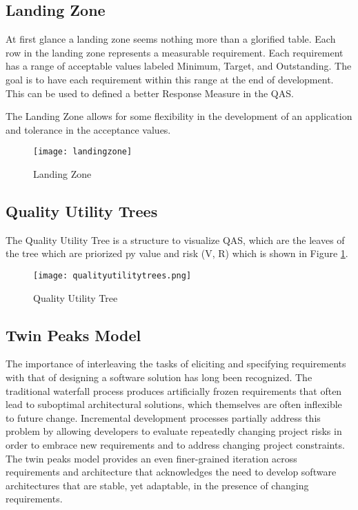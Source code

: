 \subsection{Landing Zone}
At first glance a landing zone seems nothing more than a glorified table. Each row in the landing zone represents a measurable requirement. Each requirement has a range of acceptable values labeled Minimum, Target, and Outstanding. The goal is to have each requirement within this range at the end of development. This can be used to defined a better Response Measure in the QAS.

The Landing Zone allows for some flexibility in the development of an application and tolerance in the acceptance values.

\begin{figure}[H]	
	\center
	\texttt{[image: landingzone]}
 	\caption{Landing Zone}
\end{figure}

\subsection{Quality Utility Trees}
The Quality Utility Tree is a structure to visualize QAS, which are the leaves of the tree which are priorized py value and risk (V, R) which is shown in Figure \ref{fig:qualityutilitytree}.

\begin{figure}[H]
	\center
	\texttt{[image: qualityutilitytrees.png]}
	\caption{Quality Utility Tree}
	\label{fig:qualityutilitytree}
\end{figure}

\subsection{Twin Peaks Model}
The importance of interleaving the tasks of eliciting and specifying requirements with that of designing a software solution has long been recognized. The traditional waterfall process produces artificially frozen requirements that often lead to suboptimal architectural solutions, which themselves are often inflexible to future change. Incremental development processes partially address this problem by allowing developers to evaluate repeatedly changing project risks in order to embrace new requirements and to address changing project constraints. The twin peaks model provides an even finer-grained iteration across requirements and architecture that acknowledges the need to develop software architectures that are stable, yet adaptable, in the presence of changing requirements.

